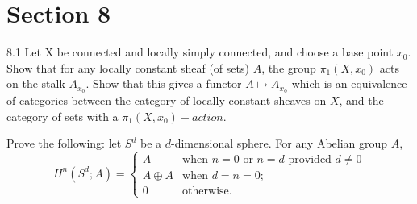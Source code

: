\newpage
\section*{Section 8}
8.1 Let X be connected and locally simply connected, and choose a base point $x_0$. Show that for any locally constant sheaf (of sets) $A$, the group $\pi_1(X,x_0)$ acts on the stalk $A_{x_0}$. Show that this gives a functor $A \mapsto A_{x_0}$ which is an equivalence of categories between the category of locally constant sheaves on $X$, and the category of sets with a $\pi_1(X,x_0)-action$. 

 Prove the following: let $S^d$ be a $d$-dimensional sphere. For any Abelian group $A$, 
\[
H^n(S^d;A)= \begin{cases} A & \text{when } n=0 \text{ or } n=d \text{ provided } d \neq 0 \\ A \oplus A & \text{when } d =n=0;\\ 0 & \text{otherwise}.
\end{cases}
\]

